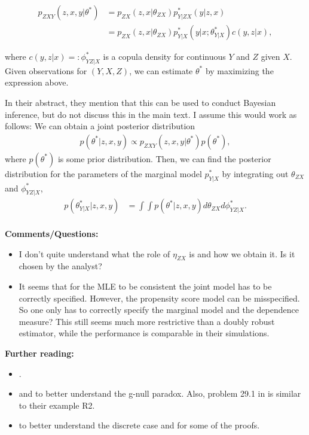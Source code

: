 \documentclass[10pt]{article}
\begin{document}
\begin{align*}
	p_{ZXY}(z, x, y | \theta^*) &= p_{ZX}(z, x | \theta_{ZX}) p_{Y|ZX}^*(y|z, x) \\
	&= p_{ZX}(z, x | \theta_{ZX}) p_{Y|X}^*(y | x; \theta_{Y|X}^*) c(y, z| x),
\end{align*}

where $c(y, z | x) =: \phi_{YZ | X}^* $ is a copula density for continuous $Y$ and $Z$ given $X$. Given observations for $(Y, X, Z)$, we can estimate $\theta^*$ by maximizing the expression above. 

In their abstract, they mention that this can be used to conduct Bayesian inference, but do not discuss this in the main text. I assume this would work as follows: We can obtain a joint posterior distribution
\begin{align*}
	p(\theta^* | z, x, y) \propto p_{ZXY}(z, x, y | \theta^*) p(\theta^*),
\end{align*}
where $p(\theta^*)$ is some prior distribution. Then, we can find the posterior distribution for the parameters of the marginal model $p_{Y|X}^*$ by integrating out $\theta_{ZX}$ and $\phi_{YZ | X}^*$,
\begin{align*}
	p(\theta_{Y|X}^* | z, x, y) &= \int \int p(\theta^* | z, x, y) d\theta_{ZX} d\phi_{YZ | X}^*.
\end{align*} \\


\textbf{Comments/Questions:}
\begin{itemize}
	\item I don't quite understand what the role of $\eta_{ZX}$ is and how we obtain it. Is it chosen by the analyst?
	\item It seems that for the MLE to be consistent the joint model has to be correctly specified. However, the propensity score model can be misspecified. So one only has to correctly specify the marginal model and the dependence measure? This still seems much more restrictive than a doubly robust estimator, while the performance is comparable in their simulations.
\end{itemize}

\textbf{Further reading:} 
\begin{itemize}
	\item \cite{saarela_2015}.
	\item \cite{robins_wasserman_1997} and \cite{mcgrath2022revisiting} to better understand the g-null paradox. Also, problem 29.1 in \cite{ding2023course} is similar to their example R2.
	\item \cite{Bergsma_Rudas_2002} to better understand the discrete case and for some of the proofs.
\end{itemize}










\end{document}
